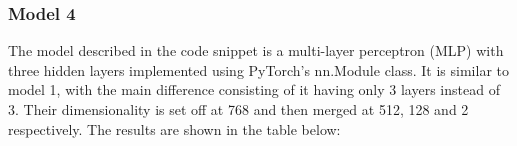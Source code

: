 \subsubsection{Model 4}


The model described in the code snippet is a multi-layer perceptron (MLP) with three hidden layers implemented using PyTorch's nn.Module class. It is similar to model 1, with the main difference consisting of it having only 3 layers instead of 3. Their dimensionality is set off at 768 and then merged at 512, 128 and 2 respectively. The results are shown in the table below:





